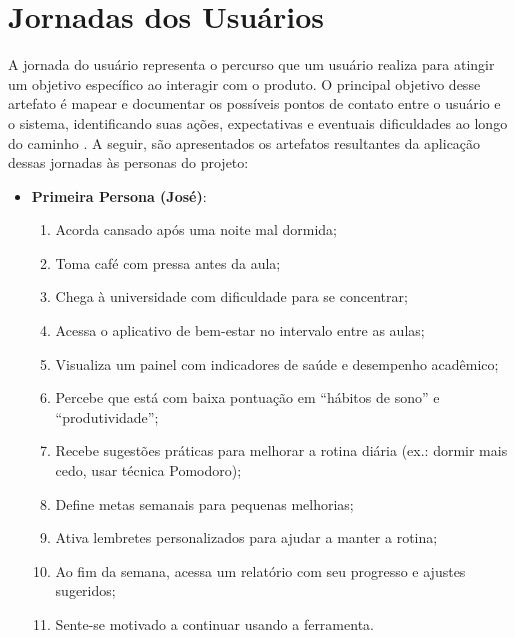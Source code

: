 \section{Jornadas dos Usuários}

A jornada do usuário representa o percurso que um usuário realiza para atingir um objetivo específico ao interagir com o produto. O principal objetivo desse artefato é mapear e documentar os possíveis pontos de contato entre o usuário e o sistema, identificando suas ações, expectativas e eventuais dificuldades ao longo do caminho \cite{caroli2017lean}. A seguir, são apresentados os artefatos resultantes da aplicação dessas jornadas às personas do projeto:

\begin{itemize}
    \item \textbf{Primeira Persona (José)}:
    \begin{enumerate}
        \item Acorda cansado após uma noite mal dormida;
        \item Toma café com pressa antes da aula;
        \item Chega à universidade com dificuldade para se concentrar;
        \item Acessa o aplicativo de bem-estar no intervalo entre as aulas;
        \item Visualiza um painel com indicadores de saúde e desempenho acadêmico;
        \item Percebe que está com baixa pontuação em “hábitos de sono” e “produtividade”;
        \item Recebe sugestões práticas para melhorar a rotina diária (ex.: dormir mais cedo, usar técnica Pomodoro);
        \item Define metas semanais para pequenas melhorias;
        \item Ativa lembretes personalizados para ajudar a manter a rotina;
        \item Ao fim da semana, acessa um relatório com seu progresso e ajustes sugeridos;
        \item Sente-se motivado a continuar usando a ferramenta.
    \end{enumerate}


\end{itemize}
